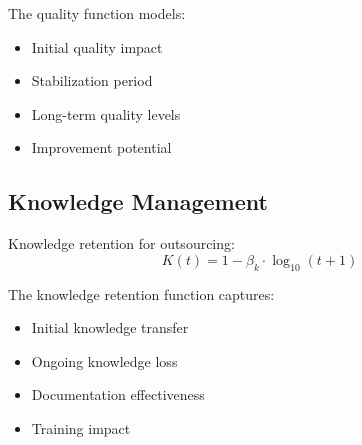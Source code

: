 \documentclass[12pt,a4paper]{article}
\newenvironment{definition}[1]
{\begin{mdframed}[style=definitionstyle,frametitle={Definition: #1}]}
{\end{mdframed}}
\newenvironment{explanation}
{\begin{mdframed}[style=explanationstyle,frametitle={Explanation}]}
{\end{mdframed}}
\begin{document}
\begin{explanation}
The quality function models:
\begin{itemize}
    \item Initial quality impact
    \item Stabilization period
    \item Long-term quality levels
    \item Improvement potential
\end{itemize}
\end{explanation}

\subsection{Knowledge Management}
\begin{definition}{Knowledge Functions}
Knowledge retention for outsourcing:
\begin{equation}
    K(t) = 1 - \beta_k \cdot \log_{10}(t + 1)
\end{equation}
\end{definition}

\begin{explanation}
The knowledge retention function captures:
\begin{itemize}
    \item Initial knowledge transfer
    \item Ongoing knowledge loss
    \item Documentation effectiveness
    \item Training impact
\end{itemize}
\end{explanation}
\end{document}
